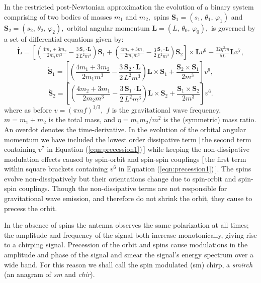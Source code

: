 In the restricted post-Newtonian approximation the evolution of a binary
system comprising of two bodies of masses $m_1$ and $m_2,$ spins
${\mathbf S}_1=(s_1,\, \theta_1, \, \varphi_1)$ and
${\mathbf S}_2=(s_2,\, \theta_2, \, \varphi_2),$ orbital angular momentum
${\mathbf L}=(L,\, \theta_0, \, \varphi_0),$ is governed by a
set of differential equations given by:
\begin{eqnarray}
\dot{\mathbf {L}} =
\left [
\left ( \frac{4m_1+3m_2}{2m_1m^3} - \frac{3\,  {\mathbf S}_2 \cdot {\mathbf L}}{2\, L^2m^3} \right ) {\mathbf S}_1 +
\left ( \frac{4m_2+3m_1}{2m_2m^3} - \frac{3}{2}\frac{ {\mathbf S}_1 \cdot {\mathbf L}}{L^2m^3} \right ) {\mathbf S}_2
\right ] \times {\mathbf L} v^6 -\frac{32\eta^2 m}{5L} {\mathbf L} v^7,
\label{eqn:precession1}
\end{eqnarray}
\begin{equation}
\dot{ \mathbf  S}_1  =
\left [ \left ( \frac{4m_1+3m_2}{2m_1m^3} - \frac{3\, {\mathbf S}_2 \cdot {\mathbf L} }{2\, L^2m^3}
\right ) {\mathbf L} \times {\mathbf S}_1 + \frac{ {\mathbf S}_2 \times {\mathbf S}_1 }{2m^3} \right ] v^6,
\label{eqn:precession2}
\end{equation}
\begin{equation}
\dot{ \mathbf  S}_2  =
\left [ \left ( \frac{4m_2+3m_1}{2m_2m^3} - \frac{3\, {\mathbf S}_1 \cdot {\mathbf L} }{2\, L^2m^3}
\right ) {\mathbf L} \times {\mathbf S}_2 + \frac{ {\mathbf S}_1 \times {\mathbf S}_2 }{2m^3} \right ] v^6.
\label{eqn:precession3}
\end{equation}
where as before $v=(\pi m f)^{1/3},$ $f$ is the gravitational wave frequency,
$m = m_1+m_2$ is the total mass, and $\eta = m_1m_2/m^2$ is
the (symmetric) mass ratio.  An overdot denotes the time-derivative.
In the evolution of the orbital angular momentum we have included
the lowest order dissipative term [\,the second term containing
$v^7$ in Equation (\ref{eqn:precession1})\,]
while keeping the non-dissipative modulation effects
caused by spin-orbit and spin-spin couplings
[\,the first term within square brackets containing
$v^6$ in Equation (\ref{eqn:precession1})\,].
The spins evolve non-dissipatively but their orientations change due to
spin-orbit and spin-spin couplings.
Though the non-dissipative terms are not responsible for
gravitational wave emission, and therefore do not shrink the
orbit, they cause to precess the orbit.

In the absence of spins the antenna observes the same polarization at
all times; the amplitude and frequency of the signal both
increase monotonically, giving rise to a chirping signal.
Precession of the orbit and spins cause modulations in the amplitude
and phase of the signal and smear the signal's energy spectrum over a wide band.
For this reason we shall call the spin modulated (sm) chirp,
a {\it smirch} (an anagram of {\it sm} and {\it chir}).

